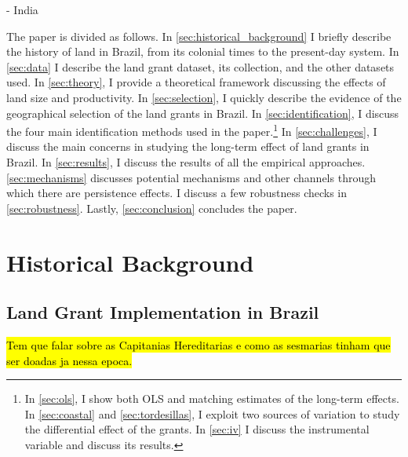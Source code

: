 \documentclass[11pt]{article}
\begin{document}
\textcite{Caum-Julio2024-gy} - India


The paper is divided as follows. In \autoref{sec:historical_background} I briefly describe the history of land in Brazil, from its colonial times to the present-day system. 
In \autoref{sec:data} I describe the land grant dataset, its collection, and the other datasets used. 
In \autoref{sec:theory}, I provide a theoretical framework discussing the effects of land size and productivity.
In \autoref{sec:selection}, I quickly describe the evidence of the geographical selection of the land grants in Brazil.
In \autoref{sec:identification}, I discuss the four main identification methods used in the paper.\footnote{In \autoref{sec:ols}, I show both OLS and matching estimates of the long-term effects.
In \autoref{sec:coastal} and \autoref{sec:tordesillas}, I exploit two sources of variation to study the differential effect of the grants.
In \autoref{sec:iv} I discuss the instrumental variable and discuss its results.}
In \autoref{sec:challenges}, I discuss the main concerns in studying the long-term effect of land grants in Brazil. 
In \autoref{sec:results}, I discuss the results of all the empirical approaches.
\autoref{sec:mechanisms} discusses potential mechanisms and other channels through which there are persistence effects.
I discuss a few robustness checks in \autoref{sec:robustness}.
Lastly, \autoref{sec:conclusion} concludes the paper.

\section{Historical Background}
\label{sec:historical_background}

\subsection{Land Grant Implementation in Brazil}

\hl{Tem que falar sobre as Capitanias Hereditarias e como as sesmarias tinham que ser doadas ja nessa epoca.}

\end{document}
